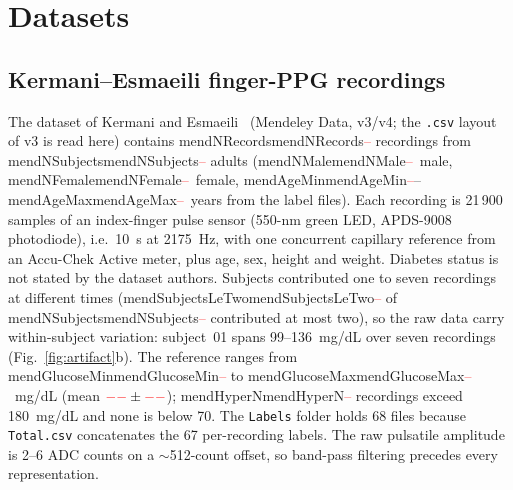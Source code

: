 \documentclass[journal]{IEEEtran}
\newcommand{\m}[1]{\ifcsname #1\endcsname\csname #1\endcsname\else\textcolor{red}{--}\fi}
\begin{document}
\section{Datasets}
\label{sec:data}

\subsection{Kermani--Esmaeili finger-PPG recordings}
\label{sec:mendeley}
The dataset of Kermani and Esmaeili~\cite{kermani2023data,kermani2025}
(Mendeley Data, v3/v4; the \texttt{.csv} layout of v3 is read here) contains
\m{mendNRecords} recordings from \m{mendNSubjects} adults (\m{mendNMale}~male,
\m{mendNFemale}~female, \m{mendAgeMin}--\m{mendAgeMax}~years from the label files).  Each recording is 21\,900 samples of an
index-finger pulse sensor (550-nm green LED, APDS-9008 photodiode), i.e.\
10~s at 2175~Hz, with one concurrent capillary reference from an Accu-Chek
Active meter, plus age, sex, height and weight.  Diabetes status is not
stated by the dataset authors.  Subjects contributed one to seven
recordings at different times (\m{mendSubjectsLeTwo} of \m{mendNSubjects}
contributed at most two), so the
raw data carry within-subject variation: subject~01 spans 99--136~mg/dL over
seven recordings (Fig.~\ref{fig:artifact}b).  The reference ranges from
\m{mendGlucoseMin} to \m{mendGlucoseMax}~mg/dL (mean
$\m{mendGlucoseMean}\pm\m{mendGlucoseStd}$); \m{mendHyperN} recordings exceed
180~mg/dL and none is below 70.  The \texttt{Labels} folder holds 68 files
because \texttt{Total.csv} concatenates the 67 per-recording labels.  The raw
pulsatile amplitude is 2--6 ADC counts on a $\sim$512-count offset, so
band-pass filtering precedes every representation.
\end{document}

